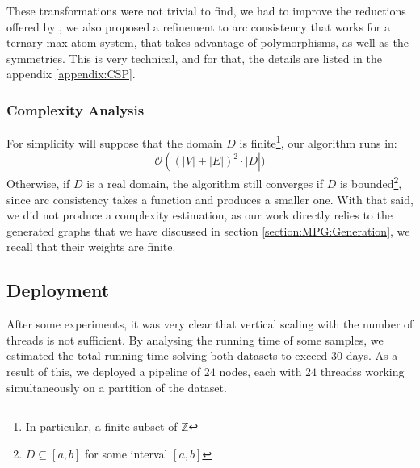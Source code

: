 These transformations were not trivial to find, we had to improve the reductions offered by \cite{MPGMaxAtom}, we also proposed a refinement to arc consistency that works for a ternary max-atom system, that takes advantage of polymorphisms, as well as the symmetries.
\newline This is very technical, and for that, the details are listed in the appendix \ref{appendix:CSP}.
\subsubsection{Complexity Analysis}
For simplicity will suppose that the domain $D$ is finite\footnote{In particular, a finite subset of $\mathbb{Z}$}, our algorithm runs in:
\begin{equation*}
	\mathcal{O}\left((\lvert V\rvert +\lvert E\rvert)^2 \cdot \lvert D\right\rvert)
\end{equation*}
Otherwise, if $D$ is a real domain, the algorithm still converges if $D$ is bounded\footnote{$D\subseteq [a,b]$ for some interval $[a,b]$}, since arc consistency takes a function and produces a smaller one. With that said, we did not produce a complexity estimation, as our work directly relies to the generated graphs that we have discussed in section \ref{section:MPG:Generation}, we recall that their weights are finite.


\subsection{Deployment}
After some experiments, it was very clear that vertical scaling with the number of threads is not sufficient. By analysing the running time of some samples, we estimated the total running time solving both datasets to exceed $30$ days.
\newline As a result of this, we deployed a pipeline of $24$ nodes, each with $24$ threadss working simultaneously on a partition of the dataset.
